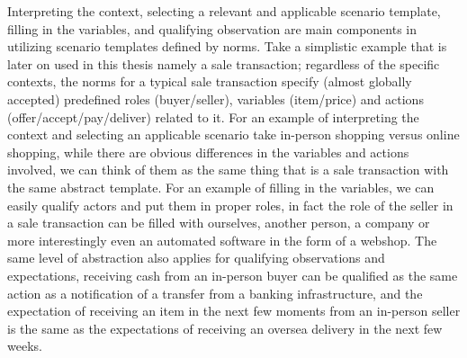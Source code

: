 Interpreting the context, selecting a relevant and applicable scenario template, filling in the variables, and qualifying observation are main components in utilizing scenario templates defined by norms. 
Take a simplistic example 
that is later on used in this thesis namely a sale transaction; regardless of the specific contexts, the norms for a typical sale transaction specify (almost globally accepted) predefined roles (buyer/seller), variables (item/price) and actions (offer/accept/pay/deliver) related to it. For an example of interpreting the context and selecting an applicable scenario take in-person shopping versus online shopping, while there are obvious differences in the variables and actions involved, we can think of them as the same thing that is a sale transaction with the same abstract template. For an example of filling in the variables, we can easily qualify actors and put them in proper roles, in fact the role of the seller in a sale transaction can be filled with ourselves, another person, a company or more interestingly even an automated software in the form of a webshop. The same level of abstraction also applies for qualifying observations and expectations, receiving cash from an in-person buyer can be qualified as the same action as a notification of a transfer from a banking infrastructure, and the expectation of receiving an item in the next few moments from an in-person seller is the same as the expectations of receiving an oversea delivery in the next few weeks.

